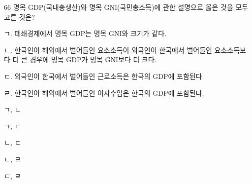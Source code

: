 \begin{question}{66}
명목 GDP(국내총생산)와 명목 GNI(국민총소득)에 관한 설명으로 옳은 것을 모두 고른 것은?
\begin{framedtext}
ㄱ. 폐쇄경제에서 명목 GDP는 명목 GNI와 크기가 같다. \par
ㄴ. 한국인이 해외에서 벌어들인 요소소득이 외국인이 한국에서 벌어들인 요소소득보다 더 큰 경우에 명목 GDP가 명목 GNI보다 더 크다. \par
ㄷ. 외국인이 한국에서 벌어들인 근로소득은 한국의 GDP에 포함된다. \par
ㄹ. 한국인이 해외에서 벌어들인 이자수입은 한국의 GDP에 포함된다.
\end{framedtext}
\begin{choices}
  \item ㄱ, ㄴ
  \item ㄱ, ㄷ
  \item ㄴ, ㄷ
  \item ㄴ, ㄹ
  \item ㄷ, ㄹ
\end{choices}
\end{question}
